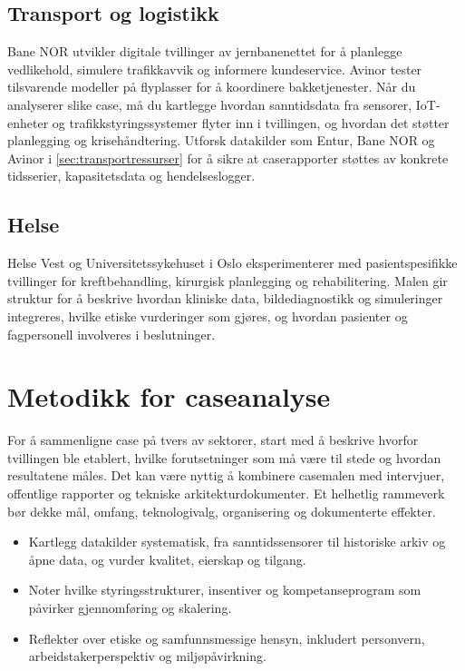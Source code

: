 \subsection*{Transport og logistikk}
Bane NOR utvikler digitale tvillinger av jernbanenettet for å planlegge vedlikehold, simulere trafikkavvik og informere kundeservice. Avinor tester tilsvarende modeller på flyplasser for å koordinere bakketjenester. Når du analyserer slike case, må du kartlegge hvordan sanntidsdata fra sensorer, IoT-enheter og trafikkstyringssystemer flyter inn i tvillingen, og hvordan det støtter planlegging og krisehåndtering. Utforsk datakilder som Entur, Bane NOR og Avinor i \autoref{sec:transportressurser} for å sikre at caserapporter støttes av konkrete tidsserier, kapasitetsdata og hendelseslogger.

\subsection*{Helse}
Helse Vest og Universitetssykehuset i Oslo eksperimenterer med pasientspesifikke tvillinger for kreftbehandling, kirurgisk planlegging og rehabilitering. Malen gir struktur for å beskrive hvordan kliniske data, bildediagnostikk og simuleringer integreres, hvilke etiske vurderinger som gjøres, og hvordan pasienter og fagpersonell involveres i beslutninger.

\section{Metodikk for caseanalyse}
For å sammenligne case på tvers av sektorer, start med å beskrive hvorfor tvillingen ble etablert, hvilke forutsetninger som må være til stede og hvordan resultatene måles. Det kan være nyttig å kombinere casemalen med intervjuer, offentlige rapporter og tekniske arkitekturdokumenter. Et helhetlig rammeverk bør dekke mål, omfang, teknologivalg, organisering og dokumenterte effekter.

\begin{itemize}
    \item Kartlegg datakilder systematisk, fra sanntidssensorer til historiske arkiv og åpne data, og vurder kvalitet, eierskap og tilgang.
    \item Noter hvilke styringsstrukturer, insentiver og kompetanseprogram som påvirker gjennomføring og skalering.
    \item Reflekter over etiske og samfunnsmessige hensyn, inkludert personvern, arbeidstakerperspektiv og miljøpåvirkning.
\end{itemize}

